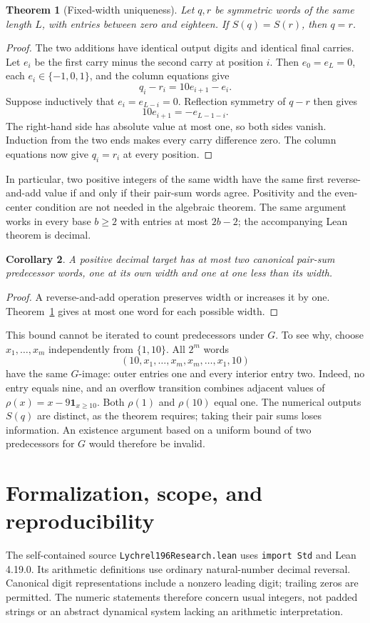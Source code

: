 \documentclass[11pt]{article}
\newtheorem{theorem}{Theorem}
\newtheorem{corollary}[theorem]{Corollary}
\begin{document}
\begin{theorem}[Fixed-width uniqueness]\label{thm:inverse}
Let $q,r$ be symmetric words of the same length $L$, with entries between
zero and eighteen. If $S(q)=S(r)$, then $q=r$.
\end{theorem}
\begin{proof}
The two additions have identical output digits and identical final carries.
Let $e_i$ be the first carry minus the second carry at position $i$.
Then $e_0=e_L=0$, each $e_i\in\{-1,0,1\}$, and the column equations give
\[
 q_i-r_i=10e_{i+1}-e_i.
\]
Suppose inductively that $e_i=e_{L-i}=0$. Reflection symmetry of $q-r$
then gives
\[
 10e_{i+1}=-e_{L-1-i}.
\]
The right-hand side has absolute value at most one, so both sides vanish.
Induction from the two ends makes every carry difference zero. The column
equations now give $q_i=r_i$ at every position.
\end{proof}

In particular, two positive integers of the same width have the same first
reverse-and-add value if and only if their pair-sum words agree. Positivity
and the even-center condition are not needed in the algebraic theorem.
The same argument works in every base $b\geq2$ with entries at most $2b-2$;
the accompanying Lean theorem is decimal.

\begin{corollary}
A positive decimal target has at most two canonical pair-sum predecessor
words, one at its own width and one at one less than its width.
\end{corollary}
\begin{proof}
A reverse-and-add operation preserves width or increases it by one.
Theorem~\ref{thm:inverse} gives at most one word for each possible width.
\end{proof}

This bound cannot be iterated to count predecessors under $G$. To see why,
choose $x_1,\ldots,x_m$ independently from $\{1,10\}$. All $2^m$ words
\[
 (10,x_1,\ldots,x_m,x_m,\ldots,x_1,10)
\]
have the same $G$-image: outer entries one and every interior entry two.
Indeed, no entry equals nine, and an overflow transition combines adjacent
values of $\rho(x)=x-9\mathbf1_{x\geq10}$. Both $\rho(1)$ and $\rho(10)$
equal one. The numerical outputs $S(q)$ are distinct, as the theorem
requires; taking their pair sums loses information. An existence argument
based on a uniform bound of two predecessors for $G$ would therefore be
invalid.

\section{Formalization, scope, and reproducibility}
The self-contained source \texttt{Lychrel196Research.lean} uses
\texttt{import Std} and Lean 4.19.0. Its arithmetic definitions use ordinary
natural-number decimal reversal. Canonical digit representations include a
nonzero leading digit; trailing zeros are permitted. The numeric statements
therefore concern usual integers, not padded strings or an abstract dynamical
system lacking an arithmetic interpretation.
\end{document}
